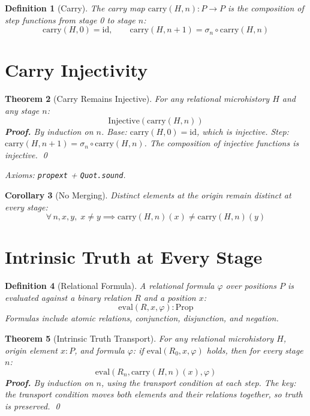 \documentclass[12pt,a4paper]{article}
\newtheorem{theorem}{Theorem}[section]
\newtheorem{definition}[theorem]{Definition}
\newtheorem{corollary}[theorem]{Corollary}
\begin{document}
\begin{definition}[Carry]
The carry map $\text{carry}(H, n) : P \to P$ is the composition of step
functions from stage 0 to stage $n$:
\[
\text{carry}(H, 0) = \text{id}, \qquad
\text{carry}(H, n+1) = \sigma_n \circ \text{carry}(H, n)
\]
\end{definition}

\section{Carry Injectivity}

\begin{theorem}[Carry Remains Injective]\label{thm:carry}
For any relational microhistory $H$ and any stage $n$:
\[
\text{Injective}(\text{carry}(H, n))
\]
\textbf{Proof.} By induction on $n$. Base: $\text{carry}(H, 0) = \text{id}$,
which is injective. Step: $\text{carry}(H, n+1) = \sigma_n \circ \text{carry}(H, n)$.
The composition of injective functions is injective. \qed

Axioms: \texttt{propext} + \texttt{Quot.sound}.
\end{theorem}

\begin{corollary}[No Merging]
Distinct elements at the origin remain distinct at every stage:
\[
\forall\, n, x, y,\; x \neq y \implies \text{carry}(H, n)(x) \neq \text{carry}(H, n)(y)
\]
\end{corollary}

\section{Intrinsic Truth at Every Stage}

\begin{definition}[Relational Formula]
A relational formula $\varphi$ over positions $P$ is evaluated against a
binary relation $R$ and a position $x$:
\[
\text{eval}(R, x, \varphi) : \text{Prop}
\]
Formulas include atomic relations, conjunction, disjunction, and negation.
\end{definition}

\begin{theorem}[Intrinsic Truth Transport]\label{thm:truth}
For any relational microhistory $H$, origin element $x : P$, and formula
$\varphi$: if $\text{eval}(R_0, x, \varphi)$ holds, then for every stage $n$:
\[
\text{eval}(R_n, \text{carry}(H, n)(x), \varphi)
\]
\textbf{Proof.} By induction on $n$, using the transport condition at each step.
The key: the transport condition moves both elements and their relations
together, so truth is preserved. \qed
\end{theorem}
\end{document}
